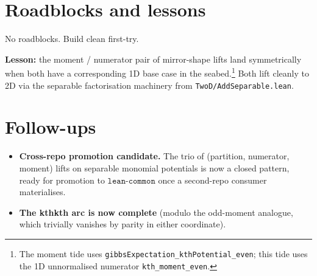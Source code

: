 \documentclass[11pt]{article}
\begin{document}
\section{Roadblocks and lessons}

No roadblocks. Build clean first-try.

\textbf{Lesson:} the moment / numerator pair of mirror-shape lifts
land symmetrically when both have a corresponding 1D base case in
the seabed.\footnote{The moment tide uses
\texttt{gibbsExpectation\_kthPotential\_even}; this tide uses the
1D unnormalised numerator \texttt{kth\_moment\_even}.} Both lift
cleanly to 2D via the separable factorisation machinery from
\texttt{TwoD/AddSeparable.lean}.

\section{Follow-ups}

\begin{itemize}
\item \textbf{Cross-repo promotion candidate.} The trio of
      (partition, numerator, moment) lifts on separable monomial
      potentials is now a closed pattern, ready for promotion to
      $\texttt{lean-common}$ once a second-repo consumer materialises.
\item \textbf{The kthkth arc is now complete} (modulo the
      odd-moment analogue, which trivially vanishes by parity in
      either coordinate).
\end{itemize}
\end{document}
